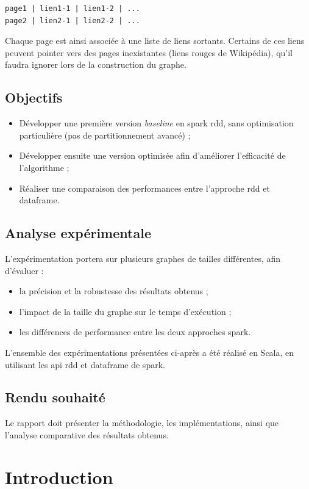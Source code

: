 \documentclass[conference]{IEEEtran}
\begin{document}
\begin{lstlisting}
page1 | lien1-1 | lien1-2 | ...
page2 | lien2-1 | lien2-2 | ...
\end{lstlisting}

Chaque page est ainsi associée à une liste de liens sortants. Certains de ces liens peuvent pointer vers des pages inexistantes (liens rouges de Wikipédia), qu'il faudra ignorer lors de la construction du graphe.  

\subsection{Objectifs}
\begin{itemize}
    \item Développer une première version \textit{baseline} en \gls{spark} \gls{rdd}, sans optimisation particulière (pas de partitionnement avancé) ;
    \item Développer ensuite une version optimisée afin d'améliorer l'efficacité de l'algorithme ;
    \item Réaliser une comparaison des performances entre l'approche \gls{rdd} et \gls{dataframe}.
\end{itemize}

\subsection{Analyse expérimentale}
L'expérimentation portera sur plusieurs graphes de tailles différentes, afin d'évaluer :  
\begin{itemize}
    \item la précision et la robustesse des résultats obtenus ;
    \item l'impact de la taille du graphe sur le temps d'exécution ;
    \item les différences de performance entre les deux approches \gls{spark}.  
\end{itemize}
L'ensemble des expérimentations présentées ci-après a été réalisé en Scala, en utilisant les \gls{api} \gls{rdd} et \gls{dataframe} de \gls{spark}.

\subsection{Rendu souhaité}
Le rapport doit présenter la méthodologie, les implémentations, ainsi que l'analyse comparative des résultats obtenus.  

\section{Introduction} \label{section:Introduction}
\end{document}
